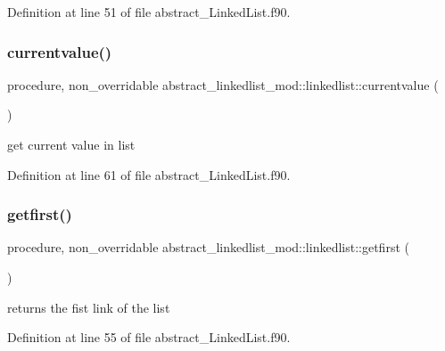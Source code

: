 Definition at line 51 of file abstract\+\_\+\+Linked\+List.\+f90.

\mbox{\label{structabstract__linkedlist__mod_1_1linkedlist_a01dda56c3e79f6e9f5b12df9a9ec192b}} 
\subsubsection{\texorpdfstring{currentvalue()}{currentvalue()}}
{\footnotesize\ttfamily procedure, non\+\_\+overridable abstract\+\_\+linkedlist\+\_\+mod\+::linkedlist\+::currentvalue (\begin{DoxyParamCaption}{ }\end{DoxyParamCaption})\hspace{0.3cm}{\ttfamily [private]}}



get current value in list 



Definition at line 61 of file abstract\+\_\+\+Linked\+List.\+f90.

\mbox{\label{structabstract__linkedlist__mod_1_1linkedlist_ae96f8c00f41925064249e443ce31f44a}} 
\subsubsection{\texorpdfstring{getfirst()}{getfirst()}}
{\footnotesize\ttfamily procedure, non\+\_\+overridable abstract\+\_\+linkedlist\+\_\+mod\+::linkedlist\+::getfirst (\begin{DoxyParamCaption}{ }\end{DoxyParamCaption})\hspace{0.3cm}{\ttfamily [private]}}



returns the fist link of the list 



Definition at line 55 of file abstract\+\_\+\+Linked\+List.\+f90.

